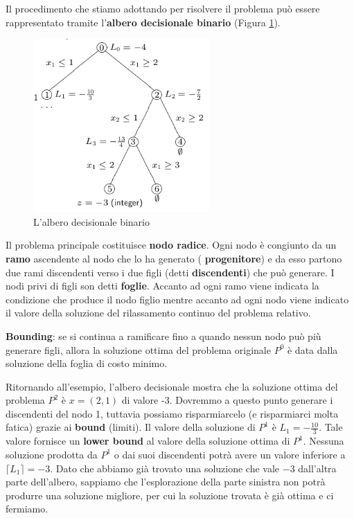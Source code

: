 \documentclass[11pt]{book}
\begin{document}
Il procedimento che stiamo adottando per risolvere il problema pu\`o
essere rappresentato tramite l'{\bf albero decisionale binario}
(Figura \ref{cap6fig610}).

\begin{figure}[h!]
  \centering
  \includegraphics[width=0.6\textwidth]{images/cap6fig610.png}
  \caption{L'albero decisionale binario}
  \label{cap6fig610}
\end{figure}

Il problema principale costituisce {\bf nodo radice}. Ogni nodo \`e
congiunto da un {\bf ramo} ascendente al nodo che lo ha generato ({\bf
  progenitore}) e da esso partono due rami discendenti verso i due
figli (detti {\bf discendenti}) che pu\`o generare. I nodi privi di
figli son detti {\bf foglie}. Accanto ad ogni ramo viene indicata la
condizione che produce il nodo figlio mentre accanto ad ogni nodo
viene indicato il valore della soluzione del rilassamento continuo del
problema relativo.

{\bf Bounding}: se si continua a ramificare fino a quando nessun
nodo pu\`o pi\`u generare figli, allora la soluzione ottima del
problema originale $P^0$ \`e data dalla soluzione della foglia di
costo minimo.

Ritornando all'esempio, l'albero decisionale mostra che la soluzione
ottima del problema $P^2$ \`e $x=(2,1)$ di valore -3. Dovremmo a
questo punto generare i discendenti del nodo 1, tuttavia possiamo
risparmiarcelo (e risparmiarci molta fatica) grazie ai {\bf bound}
(limiti). Il valore della soluzione di $P^1$ \`e $L_1 =
-\frac{10}{3}$. Tale valore fornisce un {\bf lower bound} al valore
della soluzione ottima di $P^1$. Nessuna soluzione prodotta da $P^1$ o
dai suoi discendenti potr\`a avere un valore inferiore a $\lceil L_1
\rceil = -3$. Dato che abbiamo gi\`a trovato una soluzione che vale
$-3$ dall'altra parte dell'albero, sappiamo che l'esplorazione della
parte sinistra non potr\`a produrre una soluzione migliore, per cui la
soluzione trovata \`e gi\`a ottima e ci fermiamo.
\end{document}
